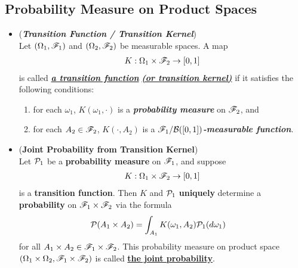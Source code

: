 \documentclass[11pt]{article}
\begin{document}
\subsection{Probability Measure on Product Spaces}
\begin{itemize}
\item \begin{definition} (\emph{\textbf{Transition Function / Transition Kernel}})\\
Let $(\Omega_1, {\mathscr F}_1)$ and $(\Omega_2, {\mathscr F}_2)$ be measurable spaces.  A map 
\begin{align*}
K: \Omega_1 \times {\mathscr F}_2 \rightarrow [0,1]
\end{align*}
is called  \underline{\emph{\textbf{a transition function}}} \underline{\emph{\textbf{(or transition kernel)}}} if it satisfies the following conditions:
\begin{enumerate}
\item for each $\omega_1$, $K(\omega_1, \cdot)$ is a \textbf{\emph{probability measure}} on ${\mathscr F}_2$, and
\item for each $A_2 \in {\mathscr F}_2$, $K(\cdot, A_2)$ is a \emph{\textbf{${\mathscr F}_1 / {\mathcal B}([0,1])$-measurable function}}.
\end{enumerate} 
\end{definition}

\item \begin{proposition} (\textbf{Joint Probability from Transition Kernel}) \citep{resnick2013probability}\\
Let ${\mathcal P}_1$ be a \textbf{probability measure} on ${\mathscr F}_1$, and suppose
\begin{align*}
K: \Omega_1 \times {\mathscr F}_2 \rightarrow [0,1]
\end{align*}
is a \textbf{transition function}. Then $K$ and ${\mathcal P}_1$ \textbf{uniquely} determine a \textbf{probability} on ${\mathscr F}_1 \times {\mathscr F}_2$ via the formula
\begin{align*}
{\mathcal P}(A_{1}\times A_{2}) &= \int_{A_{1}}K(\omega_{1}, A_{2}){\mathcal P}_{1}(d\omega_{1}) 
\end{align*} for all $A_1 \times A_2 \in {\mathscr F}_1 \times {\mathscr F}_2$. This probability measure on product space $(\Omega_{1}\times \Omega_{2}, {\mathscr F}_{1}\times {\mathscr F}_{2})$ is called \underline{\textbf{the joint probability}}.
\end{proposition}



\end{itemize}
\end{document}
